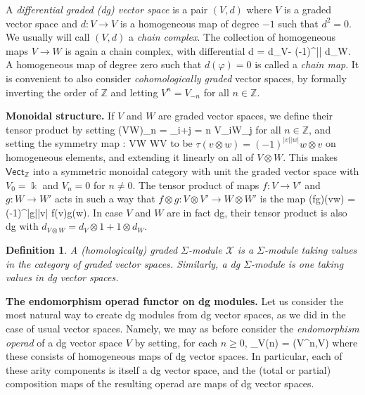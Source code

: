 \documentclass[fleqn, a4paper, twoside]{article}
\makeatletter
\newcommand{\0}{\langle 0\rangle}
\newcommand{\XX}{\mathcal{X}}
\newcommand{\End}{\operatorname{End}}
\let\[\@undefined
\DeclareRobustCommand{\[}{\begin{equation}}%
\let\]\@undefined
\DeclareRobustCommand{\]}{\end{equation}}%
\theoremstyle{mytheorem}
\theoremstyle{introthm}
\theoremstyle{mydefinition}
\newtheorem{definition}[theorem]{Definition}
\theoremstyle{mydefinition2}
\theoremstyle{plain} %
\newcommand{\?}{\,?\,}
\newcommand{\kk}{\Bbbk}
\theoremstyle{mytheorem}
\theoremstyle{plain} %
\makeatother
\begin{document}
A \emph{differential graded (dg) vector space} is a pair 
$(V,d)$ where $V$ is a graded vector space and 
$d : V\longrightarrow V$ is a homogeneous map of degree 
$-1$ such that $d^2=0$. We usually will call $(V,d)$
a \emph{chain complex}. The collection of homogeneous
maps $V\longrightarrow W$ is again a chain
complex, with differential
\[ d\varphi 
	= d_V\varphi - (-1)^{|\varphi|} \varphi d_W. \]
A homogeneous map of degree zero such that $d(\varphi)=0$
is called a \emph{chain map}.
It is
convenient to also consider \emph{cohomologically graded}
vector spaces, by formally inverting the order of $\mathbb{Z}$
and letting $V^n = V_{-n}$ for all $n\in\mathbb Z$. 

\bigskip

\textbf{Monoidal structure.} If $V$ and $W$ are
graded vector spaces, we define their tensor product
by setting
\[ (V\otimes W)_n = \bigoplus_{i+j = n} V_i\otimes W_j \]
for all $n\in\mathbb Z$, and setting the symmetry map
\[\tau : V\otimes W \longrightarrow W\otimes V\]
to be $\tau(v\otimes w) = (-1)^{|v||w|}w\otimes v$
on homogeneous elements, and extending it linearly on all of
$V\otimes W$. This makes $\mathsf{Vect}_\mathbb{Z}$ into a
symmetric monoidal category with unit the graded vector
space with $V_0 = \kk$ and $V_n = 0$ for $n\neq 0$.
The tensor product of maps $f: V\longrightarrow V'$
and $g : W\longrightarrow W'$ acts
in such a way that $f\otimes g : V\otimes V'
\longrightarrow W\otimes W'$ is the map
\[ (f\otimes g)(v\otimes w)  = (-1)^{|g||v|} f(v)\otimes g(w).\]
In case $V$ and $W$ are in fact dg, their tensor product is
also dg with $d_{V\otimes W} = d_V\otimes 1+ 1\otimes d_W$. 

\begin{definition}
A (homologically) graded $\Sigma$-module $\XX$
is a $\Sigma$-module taking values in the category
of graded vector spaces. Similarly, a dg $\Sigma$-module
is one taking values in dg vector spaces.
\end{definition}

\textbf{The endomorphism operad functor on dg modules.}
Let us consider the most natural way to create dg modules
from dg vector spaces, as we did in the case of usual
vector spaces. Namely, we may as before consider the
\emph{endomorphism operad} of a dg vector space $V$
by setting, for each $n\geqslant 0$,
\[ \End_V(n) = \hom(V^{\otimes n},V) \]
where these consists of homogeneous maps of dg vector
spaces. In particular, each of these arity components is 
itself a dg vector space, and the (total or partial)
composition maps
of the resulting operad are maps of dg vector spaces.
\end{document}
